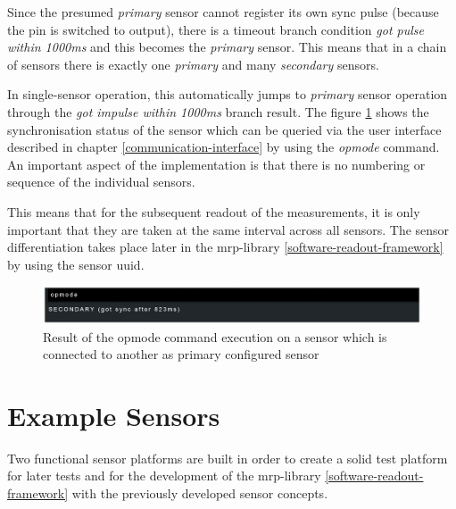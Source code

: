 Since the presumed \emph{primary} sensor cannot register its own sync
pulse (because the pin is switched to output), there is a timeout branch
condition \emph{got pulse within 1000ms} and this becomes the
\emph{primary} sensor. This means that in a chain of sensors there is
exactly one \emph{primary} and many \emph{secondary} sensors.

In single-sensor operation, this automatically jumps to \emph{primary}
sensor operation through the \emph{got impulse within 1000ms} branch
result. The figure
\ref{Result_of_the_opmode_command_execution_on_a_sensor_which_is_connected_to_another_as_primary_configured_sensor.png}
shows the synchronisation status of the sensor which can be queried via
the user interface described in chapter \ref{communication-interface} by
using the \emph{opmode} command. An important aspect of the
implementation is that there is no numbering or sequence of the
individual sensors.

This means that for the subsequent readout of the measurements, it is
only important that they are taken at the same interval across all
sensors. The sensor differentiation takes place later in the
\gls{mrp}-library \ref{software-readout-framework} by using the sensor
\gls{uuid}.

\begin{figure}
\centering
\includegraphics{./generated_images/border_Result_of_the_opmode_command_execution_on_a_sensor_which_is_connected_to_another_as_primary_configured_sensor.png}
\caption{Result of the opmode command execution on a sensor which is
connected to another as primary configured sensor
\label{Result_of_the_opmode_command_execution_on_a_sensor_which_is_connected_to_another_as_primary_configured_sensor.png}}
\end{figure}

\hypertarget{example-sensors}{%
\section{Example Sensors}\label{example-sensors}}

Two functional sensor platforms are built in order to create a solid
test platform for later tests and for the development of the
\gls{mrp}-library \ref{software-readout-framework} with the previously
developed sensor concepts.

